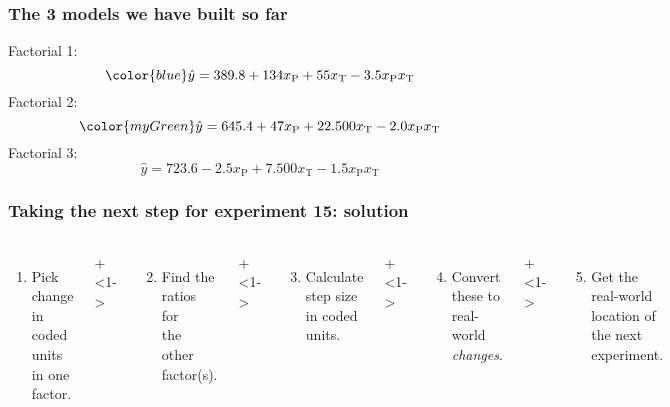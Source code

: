 \begin{frame}\frametitle{The 3 models we have built so far}
	Factorial 1:  
	\[\color{blue}\hat{y} = 389.8  +134  x_\text{P} +  55 x_\text{T} -3.5 x_\text{P}x_\text{T} \]
	Factorial 2: 
	\[\color{myGreen} \hat{y} =  645.4  +47 x_\text{P} +  22.500 x_\text{T} -2.0 x_\text{P}x_\text{T} \]
	Factorial 3:
	\[\hat{y} = 723.6  -2.5 x_\text{P} +  7.500 x_\text{T} -1.5 x_\text{P}x_\text{T} \]
	
\end{frame}

\begin{frame}\frametitle{Taking the next step for experiment 15: {\color{myOrange}solution}}
	\begin{columns}[T]
		
			\vspace{0.1cm}
			{\tiny 
				\begin{enumerate}
					\item	Pick change in coded units in one factor.
				\end{enumerate}
			 \par}
			 
			\onslide+<1->{
				{\tiny 
					\begin{enumerate}\setcounter{enumi}{1}
						\item	Find the ratios for\\ the other factor(s).
					\end{enumerate}
				
				\par}
			}
			
			\vspace{0.0cm}
			\onslide+<1->{
				{\tiny 
					\begin{enumerate}\setcounter{enumi}{2}
						\item	Calculate step size in coded units.
					\end{enumerate}
				
				\par}
			}
			
			\onslide+<1->{
				{\tiny 
					\begin{enumerate}\setcounter{enumi}{3}
						\item	Convert these to real-world \emph{changes}.
					\end{enumerate}
				
				\par}
			}
			
			\onslide+<1->{
				{\tiny 
					\begin{enumerate}\setcounter{enumi}{4}
						\item	Get the real-world location
						of the next experiment.
					\end{enumerate}
				
}}
\end{columns}
\end{frame}
